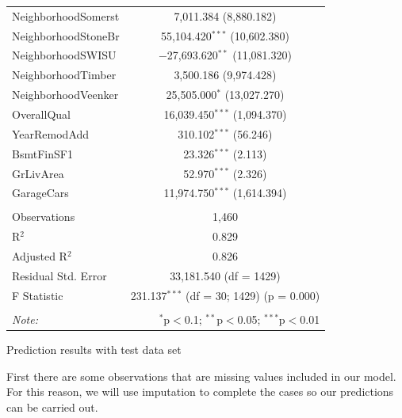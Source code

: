 \documentclass[]{article}
\begin{document}
\begin{table}[!htbp]
\begin{tabular}{@{\extracolsep{5pt}}lc}
  NeighborhoodSomerst & 7,011.384 (8,880.182) \\ 
  NeighborhoodStoneBr & 55,104.420$^{***}$ (10,602.380) \\ 
  NeighborhoodSWISU & $-$27,693.620$^{**}$ (11,081.320) \\ 
  NeighborhoodTimber & 3,500.186 (9,974.428) \\ 
  NeighborhoodVeenker & 25,505.000$^{*}$ (13,027.270) \\ 
  OverallQual & 16,039.450$^{***}$ (1,094.370) \\ 
  YearRemodAdd & 310.102$^{***}$ (56.246) \\ 
  BsmtFinSF1 & 23.326$^{***}$ (2.113) \\ 
  GrLivArea & 52.970$^{***}$ (2.326) \\ 
  GarageCars & 11,974.750$^{***}$ (1,614.394) \\ 
 \hline \\[-1.8ex] 
Observations & 1,460 \\ 
R$^{2}$ & 0.829 \\ 
Adjusted R$^{2}$ & 0.826 \\ 
Residual Std. Error & 33,181.540 (df = 1429) \\ 
F Statistic & 231.137$^{***}$ (df = 30; 1429)  (p = 0.000) \\ 
\hline 
\hline \\[-1.8ex] 
\textit{Note:}  & \multicolumn{1}{r}{$^{*}$p$<$0.1; $^{**}$p$<$0.05; $^{***}$p$<$0.01} \\ 
\end{tabular} 
\end{table}

Prediction results with test data set

First there are some observations that are missing values included in
our model. For this reason, we will use imputation to complete the cases
so our predictions can be carried out.
\end{document}
